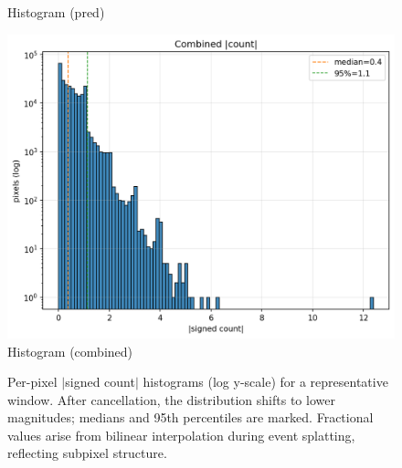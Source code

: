 \begin{figure}[t]
\begin{minipage}[t]{0.32\linewidth}
    \footnotesize Histogram (pred)
  \end{minipage}\hfill
  \begin{minipage}[t]{0.32\linewidth}
    \centering
    \includegraphics[width=\linewidth]{images/main_results/window1/hist_combined.png}\\[-2pt]
    \footnotesize Histogram (combined)
  \end{minipage}
\caption{Per-pixel $|$signed count$|$ histograms (log y-scale) for a representative window. After cancellation, the distribution shifts to lower magnitudes; medians and 95th percentiles are marked. Fractional values arise from bilinear interpolation during event splatting, reflecting subpixel structure.}
  \label{fig:hist_panel}
\end{figure}

